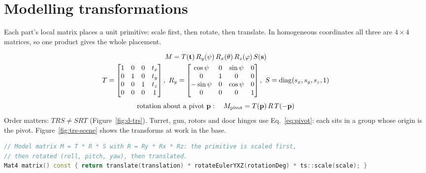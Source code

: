 \section{Modelling transformations}
\label{sec:trs}
Each part's local matrix places a unit primitive: scale first, then rotate, then translate. In homogeneous
coordinates all three are $4\times4$ matrices, so one product gives the whole placement.

\begin{gather}
M = T(\mathbf{t})\,R_y(\psi)\,R_x(\theta)\,R_z(\varphi)\,S(\mathbf{s})\label{eq:trs}\\
T=\begin{bmatrix}1&0&0&t_x\\0&1&0&t_y\\0&0&1&t_z\\0&0&0&1\end{bmatrix},\
R_y=\begin{bmatrix}\cos\psi&0&\sin\psi&0\\0&1&0&0\\-\sin\psi&0&\cos\psi&0\\0&0&0&1\end{bmatrix},\
S=\mathrm{diag}(s_x,s_y,s_z,1)\nonumber
\end{gather}
\begin{equation}
\text{rotation about a pivot } \mathbf{p}:\quad M_{\text{pivot}} = T(\mathbf{p})\,R\,T(-\mathbf{p})
\label{eq:pivot}
\end{equation}
Order matters: $TRS\neq SRT$ (Figure~\ref{fig:d-trs}). Turret, gun, rotors and door hinges use Eq.~\eqref{eq:pivot}:
each sits in a group whose origin is the pivot. Figure~\ref{fig:trs-scene} shows the transforms at work in the base.

\begin{lstlisting}[language=C++,caption={The local matrix of every scene node (\code{src/scene/Transform.h}).}]
// Model matrix M = T * R * S with R = Ry * Rx * Rz: the primitive is scaled first,
// then rotated (roll, pitch, yaw), then translated.
Mat4 matrix() const { return translate(translation) * rotateEulerYXZ(rotationDeg) * ts::scale(scale); }
\end{lstlisting}

